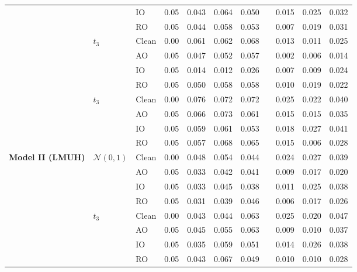 \documentclass[10pt, a4paper]{article}
\theoremstyle{assumption}
\theoremstyle{definition}
\theoremstyle{theorem}
\begin{document}
\begin{figure}
\begin{table}[!htbp]
{\begin{tabular}{lllcccccccc}
&                      & IO    & 0.05 & 0.043 & 0.064 & 0.050 & & 0.015 & 0.025 & 0.032 \\
&                      & RO    & 0.05 & 0.044 & 0.058 & 0.053 & & 0.007 & 0.019 & 0.031 \\
\cmidrule{2-11}
& $t_3$                & Clean & 0.00 & 0.061 & 0.062 & 0.068 & & 0.013 & 0.011 & 0.025 \\
&                      & AO    & 0.05 & 0.047 & 0.052 & 0.057 & & 0.002 & 0.006 & 0.014 \\
&                      & IO    & 0.05 & 0.014 & 0.012 & 0.026 & & 0.007 & 0.009 & 0.024 \\
&                      & RO    & 0.05 & 0.050 & 0.058 & 0.058 & & 0.010 & 0.019 & 0.022 \\
& $t_3$                & Clean & 0.00 & 0.076 & 0.072 & 0.072 & & 0.025 & 0.022 & 0.040 \\
&                      & AO    & 0.05 & 0.066 & 0.073 & 0.061 & & 0.015 & 0.015 & 0.035 \\
&                      & IO    & 0.05 & 0.059 & 0.061 & 0.053 & & 0.018 & 0.027 & 0.041 \\
&                      & RO    & 0.05 & 0.057 & 0.068 & 0.065 & & 0.015 & 0.006 & 0.028 \\
\midrule
\multirow{8}{*}{\textbf{Model II (LMUH)}}
& $\mathcal{N}(0, 1)$  & Clean & 0.00 & 0.048 & 0.054 & 0.044 & & 0.024 & 0.027 & 0.039 \\
&                      & AO    & 0.05 & 0.033 & 0.042 & 0.041 & & 0.009 & 0.017 & 0.020 \\
&                      & IO    & 0.05 & 0.033 & 0.045 & 0.038 & & 0.011 & 0.025 & 0.038 \\
&                      & RO    & 0.05 & 0.031 & 0.039 & 0.046 & & 0.006 & 0.017 & 0.026 \\
\cmidrule{2-11}
& $t_3$                & Clean & 0.00 & 0.043 & 0.044 & 0.063 & & 0.025 & 0.020 & 0.047 \\
&                      & AO    & 0.05 & 0.045 & 0.055 & 0.063 & & 0.009 & 0.010 & 0.037 \\
&                      & IO    & 0.05 & 0.035 & 0.059 & 0.051 & & 0.014 & 0.026 & 0.038 \\
&                      & RO    & 0.05 & 0.043 & 0.067 & 0.049 & & 0.010 & 0.010 & 0.028 \\
\bottomrule
\end{tabular}%
}
\end{table}




\end{figure}
\end{document}

